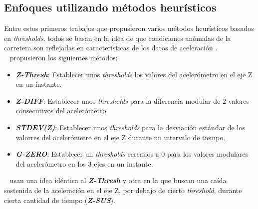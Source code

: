 	\subsection{Enfoques utilizando métodos heurísticos}
		Entre estos primeros trabajos que propusieron varios métodos heurísticos basados en \emph{thresholds}, todos se basan en la idea
		de que condiciones anómalas de la carretera son reflejadas en características de los datos de aceleración .\\
		~\textcite{mednis2011real} propusieron los siguientes métodos:\\

		\begin{itemize}
			\item  \emph{\textbf {Z-Thresh}}: Establecer unos \emph{thresholds} los valores del acelerómetro en el eje Z en un instante.\\
			\item \emph{\textbf {Z-DIFF}}: Establecer unos \emph{thresholds} para la diferencia modular de 2 valores consecutivos del
				acelerómetro.\\
			\item \emph{\textbf {STDEV(Z)}}: Establecer unos \emph{thresholds} para la desviación estándar de los valorres del acelerómetro en
				el eje Z durante un intervalo de tiempo.\\ 
			\item \emph{\textbf {G-ZERO}}: Establecer un \emph{thresholds} cercanos a 0 para los valores modulares del acelerómetro
				en los 3 ejes en un instante.\\
		\end{itemize}

		~\textcite{mohan2008nericell} usan una idea idéntica al \emph{\textbf{Z-Thresh}} y otra en la que buscan una caída sostenida de la 
		aceleración en el eje Z, por debajo de cierto \emph{threshold}, durante cierta cantidad de tiempo (\emph{\textbf{Z-SUS}}).\\


